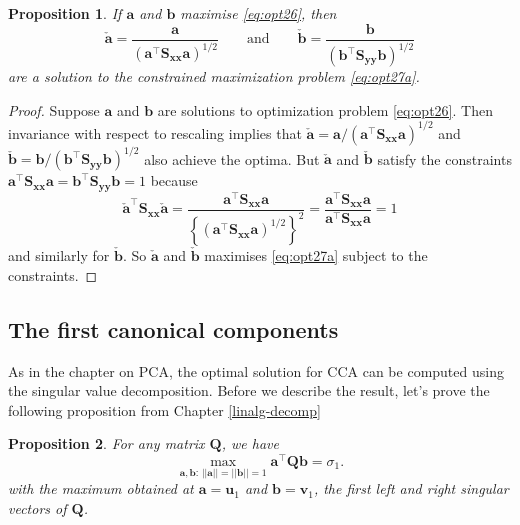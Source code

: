 \documentclass[
]{book}
\newtheorem{proposition}{Proposition}[chapter]
\theoremstyle{definition}
\theoremstyle{definition}
\theoremstyle{definition}
\theoremstyle{definition}
\theoremstyle{remark}
\begin{document}
\begin{proposition}
\protect\hypertarget{prp:unnamed-chunk-1}{}\label{prp:unnamed-chunk-1}If \(\mathbf a\) and \(\mathbf b\) maximise \eqref{eq:opt26}, then
\[
\check{\mathbf a}=\frac{\mathbf a}{(\mathbf a^\top \mathbf S_{\mathbf x\mathbf x}{\mathbf a})^{1/2}} \qquad \text{and} \qquad
\check{\mathbf b}= \frac{{\mathbf b}}{({\mathbf b}^\top \mathbf S_{\mathbf y\mathbf y}{\mathbf b})^{1/2}}
\]
are a solution to the constrained maximization problem \eqref{eq:opt27a}.
\end{proposition}

\begin{proof}
Suppose \({\mathbf a}\) and \({\mathbf b}\) are solutions to optimization problem \eqref{eq:opt26}. Then invariance with respect to rescaling implies that \(\check{\mathbf a}={\mathbf a}/({\mathbf a}^\top \mathbf S_{\mathbf x\mathbf x} {\mathbf a})^{1/2}\) and \(\check{\mathbf b}= {\mathbf b}/({\mathbf b}^\top \mathbf S_{\mathbf y\mathbf y} {\mathbf b})^{1/2}\) also achieve the optima.
But \(\check{\mathbf a}\) and \(\check{\mathbf b}\) satisfy the constraints \(\mathbf a^\top \mathbf S_{\mathbf x\mathbf x}\mathbf a=\mathbf b^\top \mathbf S_{\mathbf y\mathbf y}\mathbf b=1\)
because
\[
\check{\mathbf a}^\top \mathbf S_{\mathbf x\mathbf x} \check{\mathbf a}=\frac{{\mathbf a}^\top \mathbf S_{\mathbf x\mathbf x}{\mathbf a}}{\left \{ \left ({\mathbf a}^\top \mathbf S_{\mathbf x\mathbf x}{\mathbf a}\right )^{1/2}\right \}^2}
=\frac{{\mathbf a}^\top \mathbf S_{\mathbf x\mathbf x}{\mathbf a}}{{\mathbf a}^\top \mathbf S_{\mathbf x\mathbf x}{\mathbf a}}=1
\]
and similarly for \(\check{\mathbf b}\).
So \(\check{\mathbf a}\) and \(\check{\mathbf b}\) maximises \eqref{eq:opt27a} subject to the constraints.
\end{proof}

\subsection{The first canonical components}\label{the-first-canonical-components}

As in the chapter on PCA, the optimal solution for CCA can be computed using the singular value decomposition. Before we describe the result, let's prove the following proposition from Chapter \ref{linalg-decomp}

\begin{proposition}
\protect\hypertarget{prp:svdmax2}{}\label{prp:svdmax2}For any matrix \(\mathbf Q\), we have
\[
\max_{\mathbf a, \mathbf b:\, \vert \vert \mathbf a\vert \vert=\vert \vert \mathbf b\vert \vert =1} \mathbf a^\top \mathbf Q\mathbf b=\sigma_1.
\]
with the maximum obtained at \(\mathbf a=\mathbf u_1\) and \(\mathbf b=\mathbf v_1\), the first left and right singular vectors of \(\mathbf Q\).
\end{proposition}
\end{document}
